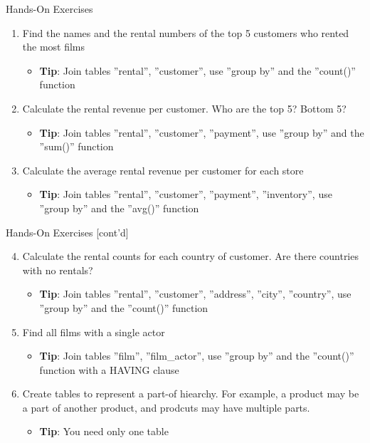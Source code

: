 \documentclass[ignorenonframetext,xcolor=x11names]{beamer}
\begin{document}
\begin{frame}{Hands-On Exercises}
\begin{enumerate}
  \item Find the names and the rental numbers of the top 5 customers who rented the most films
  \begin{itemize}
    \item \textbf{Tip}: Join tables ''rental'', ''customer'', use ''group by'' and the ''count()'' function
  \end{itemize}
  \item Calculate the rental revenue per customer. Who are the top 5? Bottom 5?
  \begin{itemize}
    \item \textbf{Tip}: Join tables ''rental'', ''customer'', ''payment'', use ''group by'' and the ''sum()'' function
  \end{itemize}
  \item Calculate the average rental revenue per customer for each store
  \begin{itemize}
    \item \textbf{Tip}: Join tables ''rental'', ''customer'', ''payment'', ''inventory'', use ''group by'' and the ''avg()'' function
  \end{itemize}
\end{enumerate}
\end{frame}

\begin{frame}{Hands-On Exercises \small [cont'd]}
\begin{enumerate}
  \setcounter{enumi}{3}
  \item Calculate the rental counts for each country of customer. Are there countries with no rentals?
  \begin{itemize}
    \item \textbf{Tip}: Join tables ''rental'', ''customer'', ''address'', ''city'', ''country'', use ''group by'' and the ''count()'' function
  \end{itemize}
  \item Find all films with a single actor
  \begin{itemize}
    \item \textbf{Tip}: Join tables ''film'', ''film\_actor'', use ''group by'' and the ''count()'' function with a HAVING clause
  \end{itemize}
  \item Create tables to represent a part-of hiearchy. For example, a product may be a part of another product, and prodcuts may have multiple parts.
  \begin{itemize}
    \item \textbf{Tip}: You need only one table
  \end{itemize}
\end{enumerate}
\end{frame}
\end{document}
